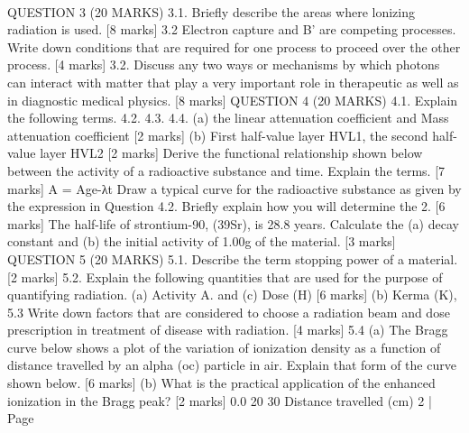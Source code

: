 \documentclass[12pt]{article}  %
\begin{document}
\begin{enumerate}
﻿

QUESTION 3 (20 MARKS)
3.1. Briefly describe the areas where lonizing radiation is used. [8 marks]
3.2
Electron capture and B' are competing processes. Write down conditions that are required for one process to proceed over the other process. [4 marks]
3.2. Discuss any two ways or mechanisms by which photons can interact with matter that play a very important role in therapeutic as well as in diagnostic medical physics. [8 marks]
QUESTION 4 (20 MARKS)
4.1. Explain the following terms.
4.2.
4.3.
4.4.
(a) the linear attenuation coefficient and Mass attenuation coefficient [2 marks] (b) First half-value layer HVL1, the second half-value layer HVL2 [2 marks]
Derive the functional relationship shown below between the activity of a radioactive substance and time. Explain the terms. [7 marks]
A =
Age-λt
Draw a typical curve for the radioactive substance as given by the expression in Question 4.2. Briefly explain how you will determine the 2. [6 marks]
The half-life of strontium-90, (39Sr), is 28.8 years. Calculate the (a) decay constant and (b) the initial activity of 1.00g of the material. [3 marks]
QUESTION 5 (20 MARKS)
5.1. Describe the term stopping power of a material. [2 marks]
5.2.
Explain the following quantities that are used for the purpose of quantifying radiation. (a) Activity A. and (c) Dose (H) [6 marks]
(b) Kerma (K),
5.3 Write down factors that are considered to choose a radiation beam and dose prescription in treatment of disease with radiation. [4 marks]
5.4 (a) The Bragg curve below shows a plot of the variation of ionization density as a function of distance travelled by an alpha (oc) particle in air. Explain that form of the curve shown below. [6 marks]
(b) What is the practical application of the enhanced ionization in the Bragg peak? [2 marks]
0.0
20
30
Distance travelled (cm)
2 | Page

﻿


\end{enumerate}
\end{document}
